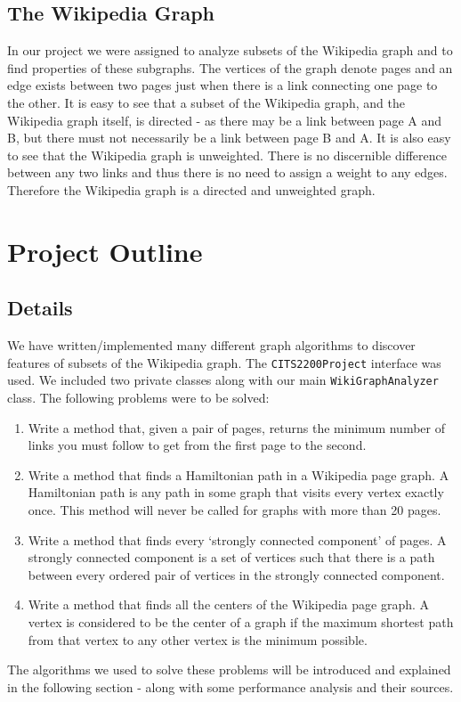 \documentclass[11pt]{article}
\begin{document}
	\subsection{The Wikipedia Graph}
	In our project we were assigned to analyze subsets of the Wikipedia graph and to find properties of these subgraphs. The vertices of the graph denote pages and an edge exists between two pages just when there is a link connecting one page to the other. It is easy to see that a subset of the Wikipedia graph, and the Wikipedia graph itself, is directed - as there may be a link between page A and B, but there must not necessarily be a link between page B and A.
	\newline
	It is also easy to see that the Wikipedia graph is unweighted. There is no discernible difference between any two links and thus there is no need to assign a weight to any edges. Therefore the Wikipedia graph is a directed and unweighted graph.
	\section{Project Outline}
	\subsection{Details}
	We have written/implemented many different graph algorithms to discover features of subsets of the Wikipedia graph. The \texttt{CITS2200Project} interface was used. We included two private classes along with our main \texttt{WikiGraphAnalyzer} class. The following problems were to be solved: \cite{amitava}
	\begin{enumerate}
		\item Write a method that, given a pair of pages, returns the minimum number of links you must follow to get from the first page to the second.
		\item Write a method that finds a Hamiltonian path in a Wikipedia page graph. A Hamiltonian path is any path in some graph that visits every vertex exactly once. This method will never be called for graphs with more than 20 pages.
		\item Write a method that finds every ‘strongly connected component’ of pages. A strongly connected component is a set of vertices such that there is a path between every ordered pair of vertices in the strongly connected component.
		\newpage
		\item Write a method that finds all the centers of the Wikipedia page graph. A vertex is considered to be the center of a graph if the maximum shortest path from that vertex to any other vertex is the minimum possible. 
	\end{enumerate}
	The algorithms we used to solve these problems will be introduced and explained in the following section - along with some performance analysis and their sources.
\end{document}
